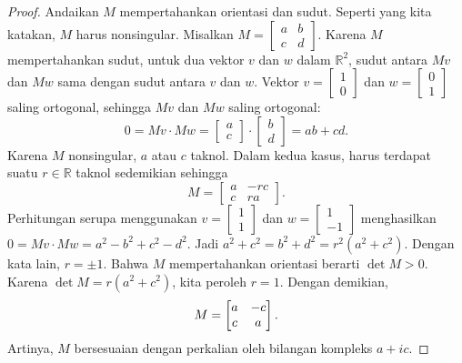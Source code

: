 \documentclass[12pt,openany]{book}
\newcommand{\avoidbreak}{\postdisplaypenalty=100}
\newcommand{\R}{{\mathbb{R}}}
\theoremstyle{plain}
\theoremstyle{remark}
\theoremstyle{definition}
\theoremstyle{exercise}
\theoremstyle{example}
\begin{document}
\begin{proof}
Andaikan $M$ mempertahankan orientasi dan sudut.
Seperti yang kita katakan, $M$ harus nonsingular.
Misalkan $M =
\left[\begin{smallmatrix}a&b\\c&d\end{smallmatrix}\right]$.
Karena $M$ mempertahankan sudut, untuk dua vektor $v$ dan
$w$ dalam $\R^2$, sudut antara $Mv$ dan $Mw$ sama dengan sudut
antara $v$ dan $w$.
Vektor
$v=\left[\begin{smallmatrix}1\\0\end{smallmatrix}\right]$ dan
$w=\left[\begin{smallmatrix}0\\1\end{smallmatrix}\right]$ saling
ortogonal, sehingga $Mv$ dan $Mw$ saling ortogonal:
\begin{equation*}
0 = Mv \cdot Mw = 
\begin{bmatrix} a\\c \end{bmatrix}
\cdot
\begin{bmatrix} b\\d \end{bmatrix}
=
ab+cd .
\end{equation*}
Karena $M$ nonsingular, $a$ atau $c$ taknol.  Dalam kedua kasus,
harus terdapat suatu $r \in \R$ taknol sedemikian sehingga
\begin{equation*}
M =
\begin{bmatrix}
a &-rc \\
c & ra
\end{bmatrix} .
\end{equation*}
Perhitungan serupa menggunakan
$v=\left[\begin{smallmatrix}1\\1\end{smallmatrix}\right]$ dan
$w=\left[\begin{smallmatrix}1\\-1\end{smallmatrix}\right]$ menghasilkan
$0 = Mv \cdot Mw = a^2-b^2+c^2-d^2$.
Jadi
$a^2+c^2 = b^2+d^2 = r^2(a^2+c^2)$.  Dengan kata lain, $r=\pm 1$.
Bahwa $M$ mempertahankan orientasi berarti $\det M > 0$.
Karena $\det M = r(a^2+c^2)$, kita peroleh $r=1$.
Dengan demikian,
\begin{equation*}
M =
\begin{bmatrix}
a & -c \\
c &  a
\end{bmatrix} .
\avoidbreak
\end{equation*}
Artinya, $M$ bersesuaian dengan perkalian oleh bilangan kompleks
$a+ic$.


\end{proof}
\end{document}
